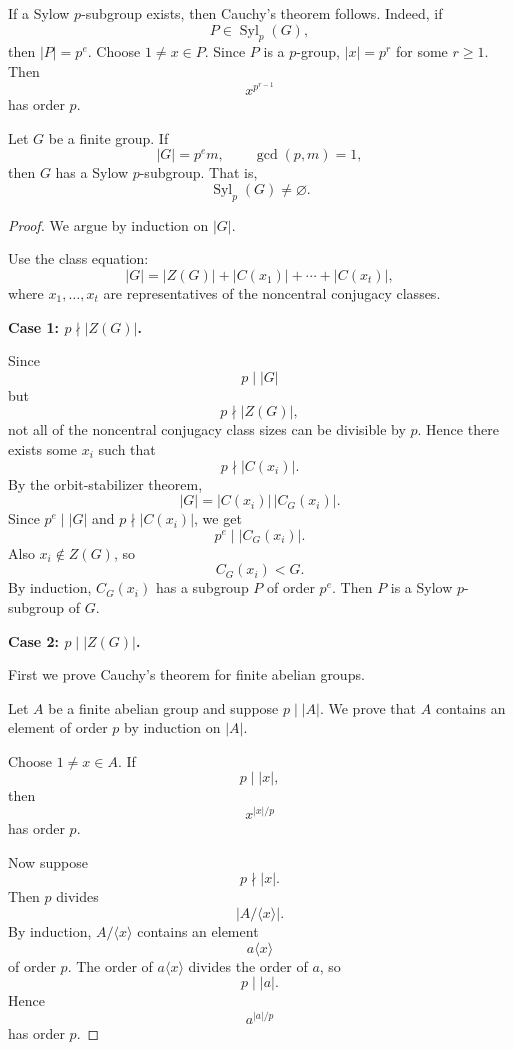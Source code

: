 \begin{remark}
If a Sylow $p$-subgroup exists, then Cauchy's theorem follows. Indeed, if
\[
    P\in \operatorname{Syl}_p(G),
\]
then $|P|=p^e$. Choose $1\neq x\in P$. Since $P$ is a $p$-group, $|x|=p^r$ for some $r\geq 1$. Then
\[
    x^{p^{r-1}}
\]
has order $p$.
\end{remark}

\begin{theorem}\label{thm:first-sylow}
Let $G$ be a finite group. If
\[
    |G|=p^e m,
    \qquad
    \gcd(p,m)=1,
\]
then $G$ has a Sylow $p$-subgroup. That is,
\[
    \operatorname{Syl}_p(G)\neq\varnothing.
\]
\end{theorem}

\begin{proof}
We argue by induction on $|G|$.

Use the class equation:
\[
    |G|
    =
    |Z(G)|+|C(x_1)|+\cdots+|C(x_t)|,
\]
where $x_1,\ldots,x_t$ are representatives of the noncentral conjugacy classes.

\medskip

\noindent\textbf{Case 1: $p\nmid |Z(G)|$.}

Since
\[
    p\mid |G|
\]
but
\[
    p\nmid |Z(G)|,
\]
not all of the noncentral conjugacy class sizes can be divisible by $p$. Hence there exists some $x_i$ such that
\[
    p\nmid |C(x_i)|.
\]
By the orbit-stabilizer theorem,
\[
    |G|=|C(x_i)|\,|C_G(x_i)|.
\]
Since $p^e\mid |G|$ and $p\nmid |C(x_i)|$, we get
\[
    p^e\mid |C_G(x_i)|.
\]
Also $x_i\notin Z(G)$, so
\[
    C_G(x_i)<G.
\]
By induction, $C_G(x_i)$ has a subgroup $P$ of order $p^e$. Then $P$ is a Sylow $p$-subgroup of $G$.

\medskip

\noindent\textbf{Case 2: $p\mid |Z(G)|$.}

First we prove Cauchy's theorem for finite abelian groups.

Let $A$ be a finite abelian group and suppose $p\mid |A|$. We prove that $A$ contains an element of order $p$ by induction on $|A|$.

Choose $1\neq x\in A$. If
\[
    p\mid |x|,
\]
then
\[
    x^{|x|/p}
\]
has order $p$.

Now suppose
\[
    p\nmid |x|.
\]
Then $p$ divides
\[
    |A/\langle x\rangle|.
\]
By induction, $A/\langle x\rangle$ contains an element
\[
    a\langle x\rangle
\]
of order $p$. The order of $a\langle x\rangle$ divides the order of $a$, so
\[
    p\mid |a|.
\]
Hence
\[
    a^{|a|/p}
\]
has order $p$.


\end{proof}
